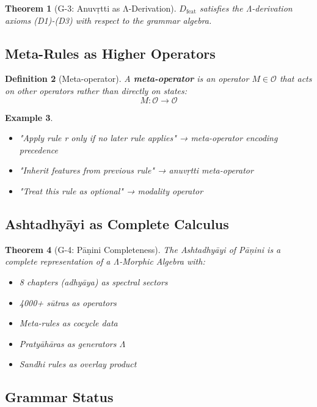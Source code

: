 \documentclass[12pt, oneside]{article}
\newtheorem{theorem}{Theorem}[section]
\newtheorem{definition}[theorem]{Definition}
\newtheorem{example}[theorem]{Example}
\newcommand{\Opr}{\mathcal{O}}
\begin{document}
\begin{theorem}[G-3: Anuvṛtti as Λ-Derivation]
$D_{\text{feat}}$ satisfies the Λ-derivation axioms (D1)-(D3) with respect to the grammar algebra.
\end{theorem}

\subsection{Meta-Rules as Higher Operators}

\begin{definition}[Meta-operator]
A \textbf{meta-operator} is an operator $M \in \Opr$ that acts on other operators rather than directly on states:
\begin{equation}
M: \Opr \rightarrow \Opr
\end{equation}
\end{definition}

\begin{example}
\begin{itemize}
    \item "Apply rule r only if no later rule applies" → meta-operator encoding precedence
    \item "Inherit features from previous rule" → anuvṛtti meta-operator
    \item "Treat this rule as optional" → modality operator
\end{itemize}
\end{example}

\subsection{Ashtadhyāyi as Complete Calculus}

\begin{theorem}[G-4: Pāṇini Completeness]
The Ashtadhyāyi of Pāṇini is a complete representation of a Λ-Morphic Algebra with:
\begin{itemize}
    \item 8 chapters (adhyāya) as spectral sectors
    \item 4000+ sūtras as operators
    \item Meta-rules as cocycle data
    \item Pratyāhāras as generators $\Lambda$
    \item Sandhi rules as overlay product
\end{itemize}
\end{theorem}

\subsection{Grammar Status}
\end{document}
